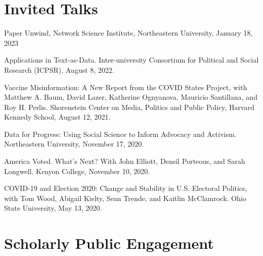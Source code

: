 \documentclass[letterpaper]{article}
\renewenvironment{itemize}{
  \begin{list}{}{
    \setlength{\leftmargin}{1.5em}
  }
}{
  \end{list}
}
\begin{document}
\section*{Invited Talks}
\begin{itemize}

\item Paper Unwind, Network Science Institute, Northeastern University, January 18, 2023

\item Applications in Text-as-Data. Inter-university Consortium for Political and Social Research (ICPSR), August 8, 2022. 

\item Vaccine Misinformation: A New Report from the COVID States Project, with Matthew A. Baum, David Lazer, Katherine Ognyanova, Mauricio Santillana, and Roy H. Perlis. Shorenstein Center on Media, Politics and Public Policy, Harvard Kennedy School, August 12, 2021.

\item Data for Progress: Using Social Science to Inform Advocacy and Activism. Northeastern University, November 17, 2020. 

\item America Voted. What's Next? With John Elliott, Densil Porteous, and Sarah Longwell. Kenyon College, November 10, 2020. 

\item COVID-19 and Election 2020: Change and Stability in U.S. Electoral Politics, with Tom Wood, Abigail Kielty, Sean Trende, and Kaitlin McClamrock. Ohio State University, May 13, 2020. 
\end{itemize}

\section*{Scholarly Public Engagement}
\end{document}
